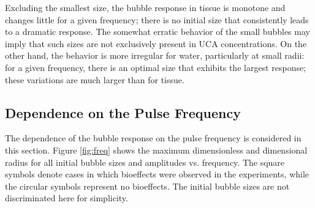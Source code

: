 Excluding the smallest size, the bubble response in tissue is monotone
and changes little for a given frequency; there is no initial size
that consistently leads to a dramatic response. The somewhat erratic
behavior of the small bubbles may imply that such sizes are not
exclusively present in UCA concentrations. On the other hand, the
behavior is more irregular for water, particularly at small radii: for
a given frequency, there is an optimal size that exhibits the largest
response; these variations are much larger than for tissue.


 \subsection{Dependence on the Pulse Frequency}

The dependence of the bubble response on the pulse frequency is
considered in this section.  Figure \ref{fig:freq} shows the maximum
dimensionless and dimensional radius for all initial bubble sizes and
amplitudes vs. frequency. The square symbols denote cases in which
bioeffects were observed in the experiments, while the circular symbols
represent no bioeffects. The initial bubble sizes are not
discriminated here for simplicity.


